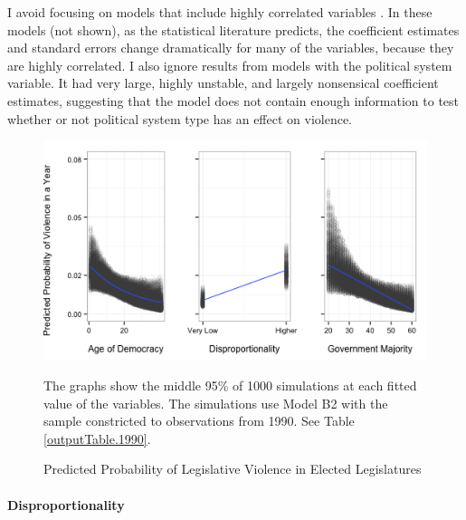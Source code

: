 \documentclass[a4paper]{article}\usepackage{graphicx, color}
\newenvironment{knitrout}{}{} %
\begin{document}
I avoid focusing on models that include highly correlated variables \citep[see][]{Achen2002, Schrodt2006}. In these models (not shown), as the statistical literature predicts, the coefficient estimates and standard errors change dramatically for many of the variables, because they are highly correlated. I also ignore results from models with the political system variable. It had very large, highly unstable, and largely nonsensical coefficient estimates, suggesting that the model does not contain enough information to test \citep{Babyak2004} whether or not political system type has an effect on violence.

\begin{figure}[t]
    \caption{Predicted Probability of Legislative Violence in Elected Legislatures}  
    \label{pred_prob}
    \begin{center}


\begin{knitrout}
\color{fgcolor}
\includegraphics[width=0.8\linewidth]{figure/predProb} 

\end{knitrout}

    \end{center}
    \begin{singlespace}
      {\scriptsize{The graphs show the middle 95\% of 1000 simulations at each fitted value of the variables. The simulations use Model B2 with the sample constricted to observations from 1990. See Table \ref{outputTable.1990}.}}
    \end{singlespace}
\end{figure}

\paragraph{Disproportionality}
\end{document}
